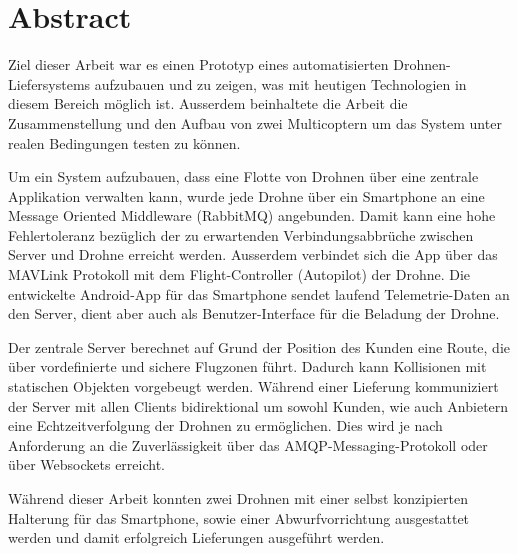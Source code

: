 \newpage
{}
\chapter*{Abstract}
Ziel dieser Arbeit war es einen Prototyp eines automatisierten Drohnen-Liefersystems aufzubauen und zu zeigen, was mit heutigen Technologien in diesem Bereich möglich ist. Ausserdem beinhaltete die Arbeit die Zusammenstellung und den Aufbau von zwei Multicoptern um das System unter realen Bedingungen testen zu können.

Um ein System aufzubauen, dass eine Flotte von Drohnen über eine zentrale Applikation verwalten kann, wurde jede Drohne über ein Smartphone an eine Message Oriented Middleware (RabbitMQ) angebunden. Damit kann eine hohe Fehlertoleranz bezüglich der zu erwartenden Verbindungsabbrüche zwischen Server und Drohne erreicht werden. Ausserdem verbindet sich die App über das \Gls{MAVLink} Protokoll mit dem \Gls{Flight-Controller} (Autopilot) der Drohne. Die entwickelte Android-App für das Smartphone sendet laufend Telemetrie-Daten an den Server, dient aber auch als Benutzer-Interface für die Beladung der Drohne. 

Der zentrale Server berechnet auf Grund der Position des Kunden eine Route, die über vordefinierte und sichere Flugzonen führt. Dadurch kann Kollisionen mit statischen Objekten vorgebeugt werden. Während einer Lieferung kommuniziert der Server mit allen Clients bidirektional um sowohl Kunden, wie auch Anbietern eine Echtzeitverfolgung der Drohnen zu ermöglichen. Dies wird je nach Anforderung an die Zuverlässigkeit über das AMQP-Messaging-Protokoll oder über Websockets erreicht.  

Während dieser Arbeit konnten zwei Drohnen mit einer selbst konzipierten Halterung für das Smartphone, sowie einer Abwurfvorrichtung ausgestattet werden und damit erfolgreich Lieferungen ausgeführt werden. 



